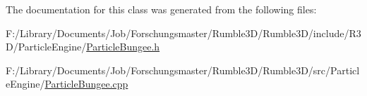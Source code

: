 The documentation for this class was generated from the following files\+:\begin{DoxyCompactItemize}
\item 
F\+:/\+Library/\+Documents/\+Job/\+Forschungsmaster/\+Rumble3\+D/\+Rumble3\+D/include/\+R3\+D/\+Particle\+Engine/\hyperlink{_particle_bungee_8h}{Particle\+Bungee.\+h}\item 
F\+:/\+Library/\+Documents/\+Job/\+Forschungsmaster/\+Rumble3\+D/\+Rumble3\+D/src/\+Particle\+Engine/\hyperlink{_particle_bungee_8cpp}{Particle\+Bungee.\+cpp}\end{DoxyCompactItemize}
